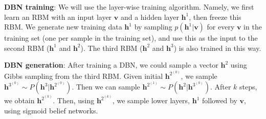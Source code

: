 \textbf{DBN training}: We will use the layer-wise training algorithm. Namely, we first learn an RBM with an input layer $\textbf{v}$ and a hidden layer $\textbf{h}^{1}$, then freeze this RBM. 
We generate new training data $\textbf{h}^{1}$ by sampling $p(\textbf{h}^{1}|\textbf{v})$ for every $\textbf{v}$ in the training set (one per sample in the training set), and use this as the input to the second RBM ($\textbf{h}^{1}$ and $\textbf{h}^{2}$). 
The third RBM ($\textbf{h}^{2}$ and $\textbf{h}^{3}$) is also trained in this way.

\textbf{DBN generation}: After training a DBN, we could sample a vector $\textbf{h}^{2}$ using Gibbs sampling from the third RBM.
Given initial $\textbf{h}^{2^{(0)}}$, we sample $\textbf{h}^{3^{(0)}}\sim P(\textbf{h}^{3}|\textbf{h}^{2^{(0)}})$. 
Then we can sample $\textbf{h}^{2^{(1)}}\sim P(\textbf{h}^{2}|\textbf{h}^{3^{(0)}})$. 
After $k$ steps, we obtain $\textbf{h}^{2^{(k)}}$.
Then, using $\textbf{h}^{2^{(k)}}$, we sample lower layers, $\textbf{h}^{1}$ followed by $\textbf{v}$, using sigmoid belief networks.

\pagebreak
